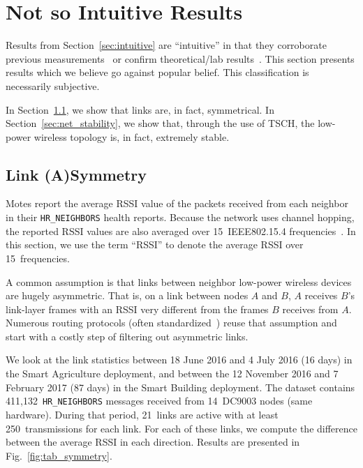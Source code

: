 \documentclass{elsarticle}
\newcommand{\building}            {Smart Building\xspace}
\newcommand{\agri}                {Smart Agriculture\xspace}
\newcommand{\HRNEIGHBORS}         {{\tt HR\_NEIGHBORS}\xspace}
\begin{document}
\section{Not so Intuitive Results}
\label{sec:notsointuitive}

Results from Section~\ref{sec:intuitive} are ``intuitive'' in that they corroborate previous measurements~\cite{watteyne16peach} or confirm theoretical/lab results~\cite{watteyne10mitigating,watteyne09reliability,watteyne15industrial}.
This section presents results which we believe go against popular belief.
This classification is necessarily subjective.

In Section~\ref{sec:symmetry}, we show that links are, in fact, symmetrical.
In Section~\ref{sec:net_stability}, we show that, through the use of TSCH, the low-power wireless topology is, in fact, extremely stable.

\subsection{Link (A)Symmetry}
\label{sec:symmetry}


Motes report the average RSSI value of the packets received from each neighbor in their \HRNEIGHBORS health reports.
Because the network uses channel hopping, the reported RSSI values are also averaged over 15~IEEE802.15.4 frequencies~\cite{std_ieee802154_2015}.
In this section, we use the term ``RSSI'' to denote the average RSSI over 15~frequencies.


A common assumption is that links between neighbor low-power wireless devices are hugely asymmetric.
That is, on a link between nodes $A$ and $B$, $A$ receives $B$'s link-layer frames with an RSSI very different from the frames $B$ receives from $A$.
Numerous routing protocols (often standardized~\cite{rfc3626}) reuse that assumption and start with a costly step of filtering out asymmetric links.


We look at the link statistics between 18 June 2016 and 4 July 2016 (16 days) in the \agri deployment, and between the 12 November 2016 and 7 February 2017 (87 days) in the \building deployment.
The dataset contains 411,132~\HRNEIGHBORS messages received from 14~DC9003 nodes (same hardware).
During that period, 21~links are active with at least 250~transmissions for each link.
For each of these links, we compute the difference between the average RSSI in each direction.
Results are presented in Fig.~\ref{fig:tab_symmetry}.
\end{document}
